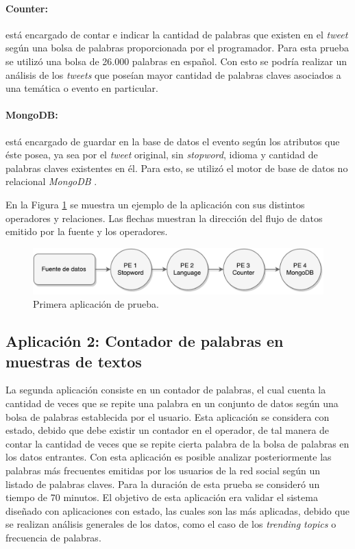 \paragraph{Counter:} está encargado de contar e indicar la cantidad de palabras que existen en el \textit{tweet} según una bolsa de palabras proporcionada por el programador. Para esta prueba se utilizó una bolsa de 26.000 palabras en español. Con esto se podría realizar un análisis de los \textit{tweets} que poseían mayor cantidad de palabras claves asociados a una temática o evento en particular.

\paragraph{MongoDB:} está encargado de guardar en la base de datos el evento según los atributos que éste posea, ya sea por el \textit{tweet} original, sin \textit{stopword}, idioma y cantidad de palabras claves existentes en él. Para esto, se utilizó el motor de base de datos no relacional \textit{MongoDB} \citep{chodorow2013mongodb}.

En la Figura \ref{fig:primeraAplicacion} se muestra un ejemplo de la aplicación con sus distintos operadores y relaciones. Las flechas muestran la dirección del flujo de datos emitido por la fuente y los operadores.

\begin{figure}[!hb]
	\centering
		\includegraphics[scale=0.75]{images/App1.pdf}
	\caption{Primera aplicación de prueba.}
	\label{fig:primeraAplicacion}
\end{figure}

\subsection{Aplicación 2: Contador de palabras en muestras de textos}
La segunda aplicación consiste en un contador de palabras, el cual cuenta la cantidad de veces que se repite una palabra en un conjunto de datos según una bolsa de palabras establecida por el usuario. Esta aplicación se considera con estado, debido que debe existir un contador en el operador, de tal manera de contar la cantidad de veces que se repite cierta palabra de la bolsa de palabras en los datos entrantes. Con esta aplicación es posible analizar posteriormente las palabras más frecuentes emitidas por los usuarios de la red social según un listado de palabras claves. Para la duración de esta prueba se consideró un tiempo de 70 minutos. El objetivo de esta aplicación era validar el sistema diseñado con aplicaciones con estado, las cuales son las más aplicadas, debido que se realizan análisis generales de los datos, como el caso de los \textit{trending topics} o frecuencia de palabras.


